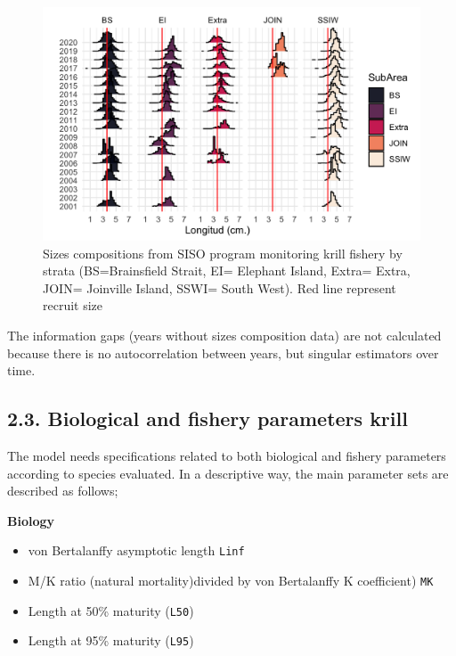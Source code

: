 \documentclass[
]{article}
\providecommand{\tightlist}{%
  \setlength{\itemsep}{0pt}\setlength{\parskip}{0pt}}
\begin{document}
\begin{figure}[H]

{\centering \includegraphics[width=1\linewidth]{tallastrata} 

}

\caption{\label{Figure 2}Sizes compositions from SISO program monitoring krill fishery by strata (BS=Brainsfield Strait, EI= Elephant Island, Extra= Extra, JOIN= Joinville Island, SSWI= South West). Red line represent recruit size}\label{fig:Figure 2}
\end{figure}

The information gaps (years without sizes composition data) are not
calculated because there is no autocorrelation between years, but
singular estimators over time.

\hypertarget{biological-and-fishery-parameters-krill}{%
\subsection{2.3. Biological and fishery parameters
krill}\label{biological-and-fishery-parameters-krill}}

The model needs specifications related to both biological and fishery
parameters according to species evaluated. In a descriptive way, the
main parameter sets are described as follows;

\textbf{Biology}

\begin{itemize}
\tightlist
\item
  von Bertalanffy asymptotic length \texttt{Linf}
\item
  M/K ratio (natural mortality)divided by von Bertalanffy K coefficient)
  \texttt{MK}
\item
  Length at 50\% maturity (\texttt{L50})
\item
  Length at 95\% maturity (\texttt{L95})
\end{itemize}
\end{document}
